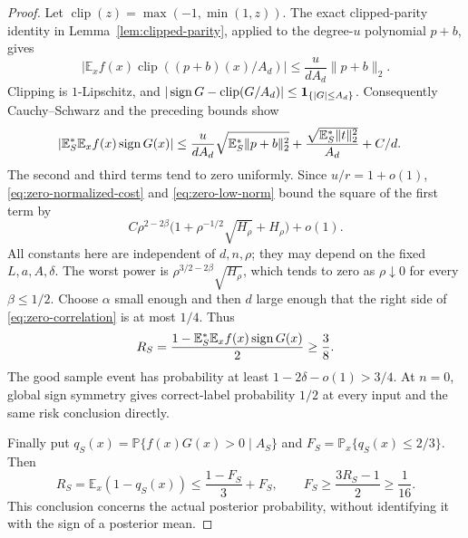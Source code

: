 \begin{proof}
Let $\operatorname{clip}(z)=\max(-1,\min(1,z))$.
The exact clipped-parity identity in Lemma~\ref{lem:clipped-parity},
applied to the degree-$u$ polynomial $p+b$, gives
\[
 \left|\mathbb E_x f(x)\operatorname{clip}((p+b)(x)/A_d)\right|
 \le\frac{u}{dA_d}\|p+b\|_2.
\]
Clipping is $1$-Lipschitz, and
$|\operatorname{sign} G-\operatorname{clip}(G/A_d)|\le\mathbf1_{\{|G|\le A_d\}}$.
Consequently Cauchy--Schwarz and the preceding bounds show
\begin{align}
 \left|\mathbb E_S^*\mathbb E_x f(x)\operatorname{sign} G(x)\right|
 &\le\frac{u}{dA_d}\sqrt{\mathbb E_S^*\|p+b\|_2^2}
       +\frac{\sqrt{\mathbb E_S^*\|t\|_2^2}}{A_d}+C/d.
 \label{eq:zero-correlation}
\end{align}
The second and third terms tend to zero uniformly. Since $u/r=1+o(1)$,
\eqref{eq:zero-normalized-cost} and \eqref{eq:zero-low-norm} bound
the square of the first term by
\begin{equation}\label{eq:zero-rho-powers}
 C\rho^{2-2\beta}
       \bigl(1+\rho^{-1/2}\sqrt{H_\rho}+H_\rho\bigr)+o(1).
\end{equation}
All constants here are independent of $d,n,\rho$; they may depend on
the fixed $L,a,A,\delta$.
The worst power is $\rho^{3/2-2\beta}\sqrt{H_\rho}$, which tends to
zero as $\rho\downarrow0$ for every $\beta\le1/2$.
Choose $\alpha$ small enough and then $d$ large enough that the right
side of \eqref{eq:zero-correlation} is at most $1/4$.
Thus
\[
 R_S=\frac{1-\mathbb E_S^*\mathbb E_x f(x)\operatorname{sign} G(x)}2\ge\frac38.
\]
The good sample event has probability at least
$1-2\delta-o(1)>3/4$. At $n=0$, global sign symmetry gives correct-label
probability $1/2$ at every input and the same risk conclusion directly.

Finally put $q_S(x)=\mathbb P\{f(x)G(x)>0\mid A_S\}$ and
$F_S=\mathbb P_x\{q_S(x)\le2/3\}$. Then
\[
 R_S=\mathbb E_x(1-q_S(x))
 \le\frac{1-F_S}{3}+F_S,
 \qquad F_S\ge\frac{3R_S-1}{2}\ge\frac1{16}.
\]
This conclusion concerns the actual posterior probability, without
identifying it with the sign of a posterior mean.
\end{proof}
